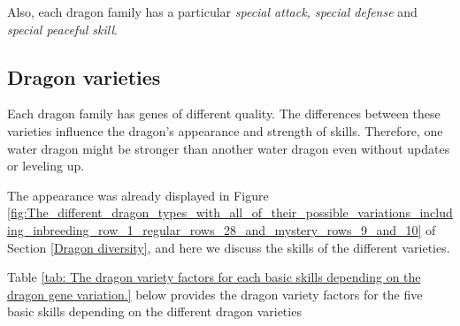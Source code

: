 \documentclass[12pt]{article}
\begin{document}

\par

Also, each dragon family has a particular \textit{special attack, special defense} and \textit{special peaceful skill}.\par


\subsection{Dragon varieties}
\label{Dragon varieties}  \par

Each dragon family has genes of different quality. The differences between these varieties influence the dragon’s appearance and strength of skills. Therefore, one water dragon might be stronger than another water dragon even without updates or leveling up.\par

The appearance was already displayed in Figure  \ref{fig:The_different_dragon_types_with_all_of_their_possible_variations_including_inbreeding_row_1_regular_rows_28_and_mystery_rows_9_and_10} of Section \ref{Dragon diversity}, and here we discuss the skills of the different varieties.\par

 Table \ref{tab: The dragon variety factors for each basic skills depending on the dragon gene variation.} below provides the dragon variety factors for the five basic skills depending on the different dragon varieties \par



\end{document}
